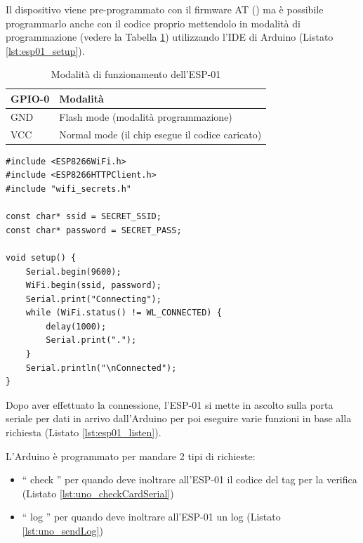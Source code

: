 \documentclass[12pt]{report}
\begin{document}
Il dispositivo viene pre-programmato con il firmware AT  (\cite{at_fw}) ma è possibile programmarlo anche con il codice proprio mettendolo in modalità di programmazione (vedere la Tabella \ref{tab:esp01_modes}) utilizzando l'IDE di Arduino (Listato \ref{lst:esp01_setup}).

\begin{table}[H]
	\begin{center}
		\begin{tabular}{l|l} 
			\textbf{GPIO-0} & \textbf{Modalità} \\
			\hline
			GND & Flash mode (modalità programmazione) \\
			VCC & Normal mode (il chip esegue il codice caricato) \\
		\end{tabular}
		\caption{Modalità di funzionamento dell'ESP-01}
		\label{tab:esp01_modes}
	\end{center}
\end{table}
\begin{lstlisting}[caption={Riprogrammazione dell'ESP-01 con il codice proprio. All'accensione, il dispositivo non fa altro che connettersi alla rete WiFi locale. Per poter fare ciò, è stata utilizzata una libreria molto bene documentata (\url{https://arduino-esp8266.readthedocs.io/en/latest/esp8266wifi/readme.html})}, label={lst:esp01_setup}]
#include <ESP8266WiFi.h>
#include <ESP8266HTTPClient.h>
#include "wifi_secrets.h"

const char* ssid = SECRET_SSID;
const char* password = SECRET_PASS;

void setup() {
	Serial.begin(9600);
	WiFi.begin(ssid, password);
	Serial.print("Connecting");
	while (WiFi.status() != WL_CONNECTED) {
		delay(1000);
		Serial.print(".");
	}
	Serial.println("\nConnected");
}
\end{lstlisting}
Dopo aver effettuato la connessione, l'ESP-01 si mette in ascolto sulla porta seriale per dati in arrivo dall'Arduino per poi eseguire varie funzioni in base alla richiesta (Listato \ref{lst:esp01_listen}).

\noindent L'Arduino è programmato per mandare 2 tipi di richieste:

\begin{itemize}
	\item \textquotedblleft{} check \textquotedblright{} per quando deve inoltrare all'ESP-01 il codice del tag per la verifica (Listato \ref{lst:uno_checkCardSerial})
	\item \textquotedblleft{} log \textquotedblright{} per quando deve inoltrare all'ESP-01 un log (Listato \ref{lst:uno_sendLog})
\end{itemize}
\end{document}
